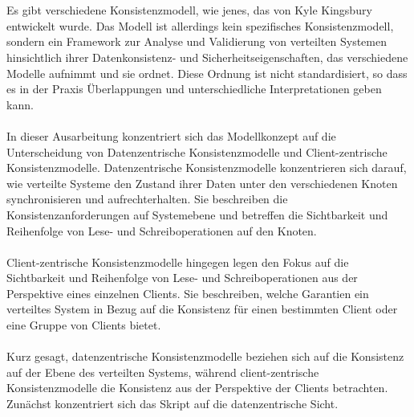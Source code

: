 \\\\
Es gibt verschiedene Konsistenzmodell, wie jenes, das von Kyle Kingsbury entwickelt wurde. Das Modell ist allerdings  kein spezifisches Konsistenzmodell, sondern ein Framework zur Analyse und Validierung von verteilten Systemen hinsichtlich ihrer Datenkonsistenz- und Sicherheitseigenschaften, das verschiedene Modelle aufnimmt und sie ordnet. Diese Ordnung ist nicht standardisiert, so dass es in der Praxis Überlappungen und unterschiedliche Interpretationen geben kann. 
\\\\
In dieser Ausarbeitung konzentriert sich das Modellkonzept auf die Unterscheidung von Datenzentrische Konsistenzmodelle und Client-zentrische Konsistenzmodelle. Datenzentrische Konsistenzmodelle konzentrieren sich darauf, wie verteilte Systeme den Zustand ihrer Daten unter den verschiedenen Knoten synchronisieren und aufrechterhalten. Sie beschreiben die Konsistenzanforderungen auf Systemebene und betreffen die Sichtbarkeit und Reihenfolge von Lese- und Schreiboperationen auf den Knoten.
\\\\
Client-zentrische Konsistenzmodelle hingegen legen den Fokus auf die Sichtbarkeit und Reihenfolge von Lese- und Schreiboperationen aus der Perspektive eines einzelnen Clients. Sie beschreiben, welche Garantien ein verteiltes System in Bezug auf die Konsistenz für einen bestimmten Client oder eine Gruppe von Clients bietet.
\\\\
Kurz gesagt, datenzentrische Konsistenzmodelle beziehen sich auf die Konsistenz auf der Ebene des verteilten Systems, während client-zentrische Konsistenzmodelle die Konsistenz aus der Perspektive der Clients betrachten. Zunächst konzentriert sich das Skript auf die datenzentrische Sicht. 


